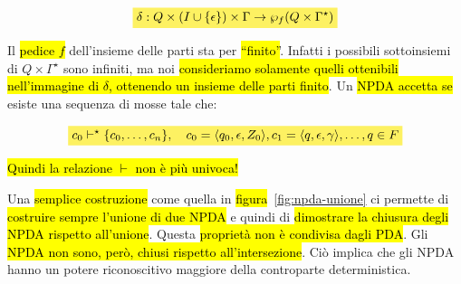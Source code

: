 \documentclass[a4paper,11pt,twoside]{article}
\theoremstyle{plain}
\theoremstyle{definition}
\theoremstyle{remark}
\newcommand{\mhl}[1]{\colorbox{hlcolor}{$\displaystyle #1$}}
\begin{document}
\begin{equation}
  \mhl{
    \delta: Q \times (I \cup \{\epsilon\}) \times \Gamma \to
      \wp_f(Q \times \Gamma^\star)
  }
\end{equation}

Il \hl{pedice $f$} dell'insieme delle parti sta per \hl{``finito''}. Infatti i possibili
sottoinsiemi di $Q \times \Gamma^\star$ sono infiniti, ma noi \hl{consideriamo
solamente quelli ottenibili nell'immagine di $\delta$, ottenendo un insieme
delle parti finito}. Un \hl{NPDA accetta se} esiste una sequenza di mosse tale che:

\begin{equation}
  \mhl{
    c_0 \vdash^\star \{c_0, \ldots, c_n \}, \quad
      c_0 = \langle q_0, \epsilon, Z_0 \rangle,
      c_1 = \langle q, \epsilon, \gamma \rangle, \ldots, q \in F
  }
\end{equation}

\hl{Quindi la relazione $\vdash$ non è più univoca!}

Una \hl{semplice costruzione} come quella in \hl{figura}~\ref{fig:npda-unione}
ci permette di \hl{costruire sempre l'unione di due NPDA} e quindi di
\hl{dimostrare la chiusura degli NPDA rispetto all'unione}. Questa \hl{proprietà
non è condivisa dagli PDA}\@. Gli \hl{NPDA non sono, però, chiusi rispetto
all'intersezione}. Ciò implica che gli NPDA hanno un potere riconoscitivo
maggiore della controparte deterministica.
\end{document}

